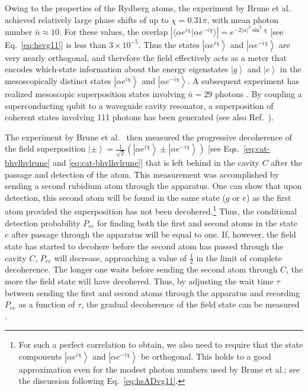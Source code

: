 \documentclass[3p,sort&compress,12pt]{elsarticle}
\newcommand{\ket}[1]{\left\vert{#1}\right\rangle}
\newcommand{\braket}[2]{\ensuremath{{\langle #1}|{#2 \rangle}}}
\providecommand{\abs}[1]{\left\lvert#1\right\rvert}
\newcommand{\E}{\ensuremath{e}}
\newcommand{\I}{\ensuremath{i}}
\begin{document}
Owing to the properties of the Rydberg atoms, the experiment by Brune et al.\ \cite{Brune:1996:om} achieved relatively large phase shifts of up to $\chi = 0.31\pi$, with mean photon number $\bar{n} \approx 10$. For these values, the overlap $\abs{\braket{\alpha \E^{\I \chi}}{\alpha \E^{-\I \chi}}}= \E^{- 2\abs{\alpha}^2\sin^2\chi}$ [see Eq.~\eqref{eq:hsvg11}] is less than $3 \times 10^{-5}$. Thus the states $\ket{\alpha \E^{\I \chi}}$ and $\ket{\alpha \E^{-\I \chi}}$ are very nearly orthogonal, and therefore the field effectively acts as a meter that encodes which-state information about the energy eigenstates $\ket{g}$ and $\ket{e}$ in the mesoscopically distinct states $\ket{\alpha \E^{\I \chi}}$ and $\ket{\alpha \E^{-\I \chi}}$. A subsequent experiment has realized mesoscopic superposition states involving $\bar{n}=29$ photons \cite{Auffeves:2003:za}. By coupling a superconducting qubit to a waveguide cavity resonator, a superposition of coherent states involving 111 photons has been generated \cite{Vlastakis:2013:pp} (see also Ref.~\cite{Hermann-Avigliano:2015:tt}). 

The experiment by Brune et al.\ \cite{Brune:1996:om,Maitre:1997:tv} then measured the progressive decoherence of the field superposition $\ket{\pm}=\frac{1}{\sqrt{2}} \left( \ket{\alpha \E^{\I \chi}} \pm \ket{\alpha \E^{-\I \chi}} \right)$ [see Eqs.~\eqref{eq:cat-bhvlhvlrune} and \eqref{eq:cat-bhvlhvlrune}] that is left behind in the cavity $C$ after the passage and detection of the atom. This measurement was accomplished by sending a second rubidium atom through the apparatus. One can show \cite{Davidovich:1996:sa, Maitre:1997:tv,Raimond:2001:aa,Kaiser:2001:tm,Schlosshauer:2007:un} that upon detection, this second atom will be found in the same state ($g$ or $e$) as the first atom provided the superposition has not been decohered.\footnote{For such a perfect correlation to obtain, we also need to require that the state components $\ket{\alpha \E^{\I \chi}}$ and $\ket{\alpha \E^{-\I \chi}}$ be orthogonal.  This holds to a good approximation even for the modest photon numbers used by Brune et al.; see the discussion following Eq.~\eqref{eq:hsADvg11}.} Thus, the conditional detection probability $P_{ee}$ for finding both the first and second atoms in the state $e$ after passage through the apparatus will be equal to one. If, however, the field state has started to decohere before the second atom has passed through the cavity $C$, $P_{ee}$ will decrease, approaching a value of $\frac{1}{2}$ in the limit of complete decoherence. The longer one waits before sending the second atom through $C$, the more the field state will have decohered. Thus, by adjusting the wait time $\tau$ between sending the first and second atoms through the apparatus and recording $P_{ee}$ as a function of $\tau$, the gradual decoherence of the field state can be measured \cite{Davidovich:1996:sa, Maitre:1997:tv,Raimond:2001:aa}. 
\end{document}
